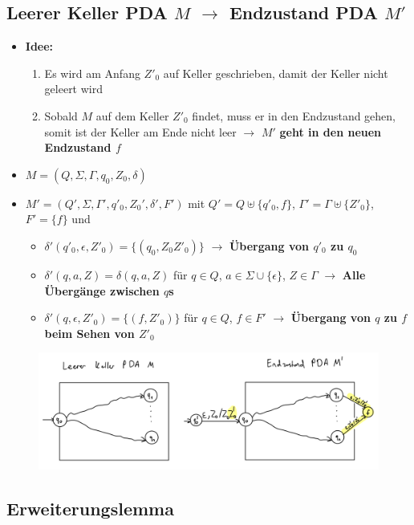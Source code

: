 \documentclass[ieeetran]{article}
\begin{document}
\subsection{Leerer Keller PDA $M$ $\rightarrow$ Endzustand PDA $M'$} %
\label{sub:leerer_keller_pDA_m_rightarrow_endzustand_pDA_m_}
\begin{itemize}
  \item \textbf{Idee:}
	  \begin{enumerate}
	    \item Es wird am Anfang $Z'_0$ auf Keller geschrieben, damit der Keller nicht geleert wird
		\item Sobald $M$ auf dem Keller $Z'_0$ findet, muss er in den Endzustand gehen, somit ist der Keller am Ende nicht leer $\rightarrow$ $M'$ \textbf{geht in den neuen Endzustand $f$}
	  \end{enumerate}

	 \item $M = (Q, \Sigma, \Gamma, q_0, Z_0, \delta)$
	 \item $M' = (Q', \Sigma, \Gamma', q'_0, Z_0', \delta', F')$ mit $Q' = Q \uplus \{q'_0,f\}$, $\Gamma' = \Gamma \uplus \{Z'_0\}$, $F' = \{f\}$ und
		 \begin{itemize}
			 \item $\delta'(q'_0, \epsilon, Z'_0) = \{(q_0, Z_0Z'_0)\}$ $\rightarrow$ \textbf{Übergang von $q'_0$ zu $q_0$}
			 \item $\delta'(q, a, Z) = \delta(q, a, Z)$ für $q \in Q$, $a \in \Sigma \cup \{\epsilon\}$, $Z \in \Gamma$ $\rightarrow$ \textbf{Alle Übergänge zwischen $q$s}
			 \item $\delta'(q, \epsilon, Z'_0) = \{(f, Z'_0)\}$ für $q \in Q$, $f \in F'$ $\rightarrow$ \textbf{Übergang von $q$ zu $f$ beim Sehen von $Z'_0$}
		 \end{itemize}
\end{itemize}
\begin{figure}[h!]
  \centering
  \includegraphics[width=0.52\linewidth]{leertoendpda.jpg}
  \label{fig:leertoendpda_jpg}
\end{figure}


\subsection{Erweiterungslemma} %
\label{sub:erweiterungslemma}
\end{document}

